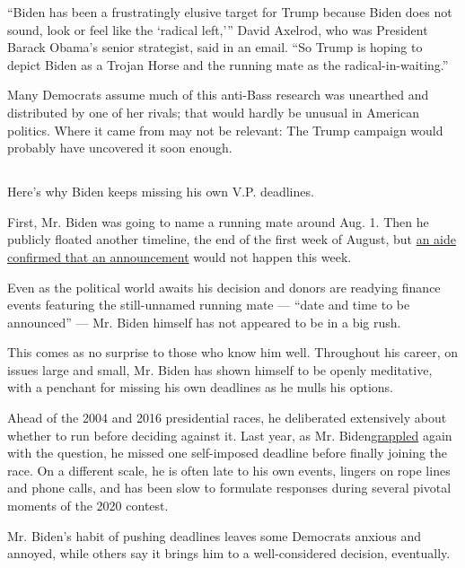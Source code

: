 ``Biden has been a frustratingly elusive target for Trump because Biden
does not sound, look or feel like the `radical left,''' David Axelrod,
who was President Barack Obama's senior strategist, said in an email.
``So Trump is hoping to depict Biden as a Trojan Horse and the running
mate as the radical-in-waiting.''

Many Democrats assume much of this anti-Bass research was unearthed and
distributed by one of her rivals; that would hardly be unusual in
American politics. Where it came from may not be relevant: The Trump
campaign would probably have uncovered it soon enough.

\hypertarget{section-2}{%
\subsection{}\label{section-2}}

Here's why Biden keeps missing his own V.P. deadlines.

First, Mr. Biden was going to name a running mate around Aug. 1. Then he
publicly floated another timeline, the end of the first week of August,
but
\href{https://www.nytimes3xbfgragh.onion/2020/08/07/us/politics/joe-biden-vice-presidential-search.html}{an
aide confirmed that an announcement} would not happen this week.

Even as the political world awaits his decision and donors are readying
finance events featuring the still-unnamed running mate --- ``date and
time to be announced'' --- Mr. Biden himself has not appeared to be in a
big rush.

This comes as no surprise to those who know him well. Throughout his
career, on issues large and small, Mr. Biden has shown himself to be
openly meditative, with a penchant for missing his own deadlines as he
mulls his options.

Ahead of the 2004 and 2016 presidential races, he deliberated
extensively about whether to run before deciding against it. Last year,
as Mr.
Biden\href{https://www.nytimes3xbfgragh.onion/2019/03/07/us/politics/biden-2020.html}{grappled}
again with the question, he missed one self-imposed deadline before
finally joining the race. On a different scale, he is often late to his
own events, lingers on rope lines and phone calls, and has been slow to
formulate responses during several pivotal moments of the 2020 contest.

Mr. Biden's habit of pushing deadlines leaves some Democrats anxious and
annoyed, while others say it brings him to a well-considered decision,
eventually.

